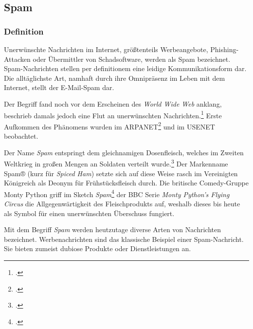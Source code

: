 \subsection{Spam} %
\label{sub:spam}
\subsubsection{Definition} %
\label{ssub:spam_definition}
Unerwünschte Nachrichten im Internet, größtenteils Werbeangebote, Phishing-Attacken oder Übermittler von Schadsoftware, werden als Spam bezeichnet.
Spam-Nachrichten stellen per definitionem eine leidige Kommunikationsform dar. Die alltäglichste Art, namhaft durch ihre Omnipräsenz im Leben mit dem Internet, stellt der E-Mail-Spam dar.

Der Begriff fand noch vor dem Erscheinen des \emph{World Wide Web} anklang, beschrieb damals jedoch eine Flut an unerwünschten Nachrichten.\footcite{originTermSpam}
Erste Aufkommen des Phänomens wurden im ARPANET\footcite{junkMailProblem} und im USENET beobachtet.

Der Name \emph{Spam} entspringt dem gleichnamigen Dosenfleisch, welches im Zweiten Weltkrieg in großen Mengen an Soldaten verteilt wurde.\footcite{lifeDuringSecondWW}
Der Markenname Spam® (kurz für \emph{Spiced Ham}) setzte sich auf diese Weise rasch im Vereinigten Königreich als Deonym für Frühstücksfleisch durch.
Die britische Comedy-Gruppe Monty Python griff im Sketch \emph{Spam}\footcite{spamMontyPython} der BBC Serie \emph{Monty Python’s Flying Circus} die Allgegenwärtigkeit des Fleischprodukts auf, weshalb dieses bis heute als Symbol für einen unerwünschten Überschuss fungiert.

Mit dem Begriff \emph{Spam} werden heutzutage diverse Arten von Nachrichten bezeichnet.
Werbenachrichten sind das klassische Beispiel einer Spam-Nachricht.
Sie bieten zumeist dubiose Produkte oder Dienstleistungen an.
